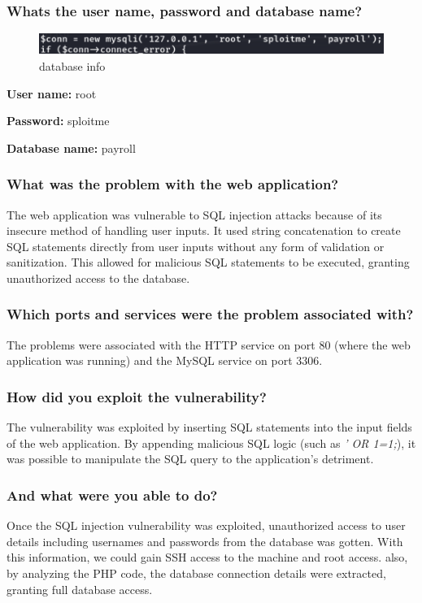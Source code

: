 \subsubsection{Whats the user name, password and database name?}

\begin{figure}[H]
    \centering
    \includegraphics[width=0.8\linewidth]{pic/database info.png}
    \caption{database info}
    \label{fig:database info}
\end{figure}

\textbf{User name:} root

\textbf{Password:} sploitme

\textbf{Database name:} payroll


\subsubsection{What was the problem with the web application?}
The web application was vulnerable to SQL injection attacks because of its insecure method
of handling user inputs. It used string concatenation to create SQL statements directly from
user inputs without any form of validation or sanitization. This allowed for malicious SQL
statements to be executed, granting unauthorized access to the database.


\subsubsection{Which ports and services were the problem associated with?}
The problems were associated with the HTTP service on port 80 (where the web application
was running) and the MySQL service on port 3306.


\subsubsection{How did you exploit the vulnerability?}
The vulnerability was exploited by inserting SQL statements into the input fields of the web
application. By appending malicious SQL logic (such as \textit{' OR 1=1;}), it was possible to
manipulate the SQL query to the application's detriment.


\subsubsection{And what were you able to do?}
Once the SQL injection vulnerability was exploited, unauthorized access to user details
including usernames and passwords from the database was gotten. With this information,
we could gain SSH access to the machine and root access. also, by analyzing the
PHP code, the database connection details were extracted, granting full database access.

